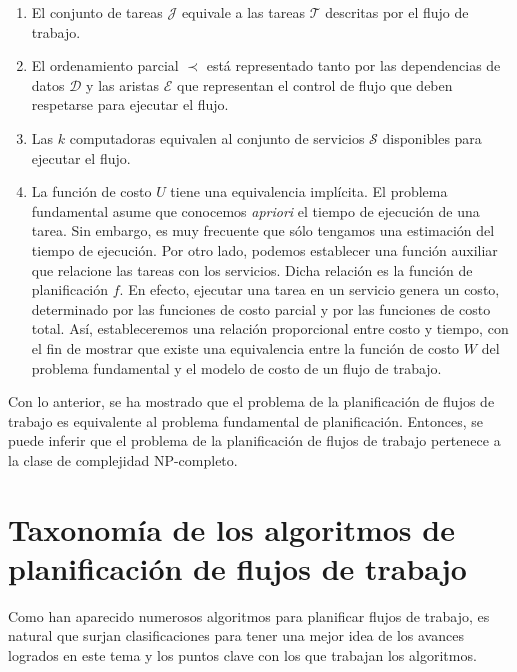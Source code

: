 \begin{enumerate}
\item El conjunto de tareas $\mathcal{J}$ equivale a las tareas $\mathcal{T}$ descritas por el flujo de trabajo.

\item El ordenamiento parcial $\prec$ está representado tanto por las dependencias de datos $\mathcal{D}$ y las aristas $\mathcal{E}$ que representan el control de flujo que deben respetarse para ejecutar el flujo.

\item Las $k$ computadoras equivalen al conjunto de servicios $\mathcal{S}$ disponibles para ejecutar el flujo.

\item La función de costo $U$ tiene una equivalencia implícita. El problema fundamental asume que conocemos \emph{apriori} el tiempo de ejecución de una tarea. Sin embargo, es muy frecuente que sólo tengamos una estimación del tiempo de ejecución. Por otro lado, podemos establecer una función auxiliar que relacione las tareas con los servicios. Dicha relación es la función de planificación $f$. En efecto, ejecutar una tarea en un servicio genera un costo, determinado por las funciones de costo parcial y por las funciones de costo total. Así, estableceremos una relación proporcional entre costo y tiempo, con el fin de mostrar que existe una equivalencia entre la función de costo $W$ del problema fundamental y el modelo de costo de un flujo de trabajo.
\end{enumerate}

Con lo anterior, se ha mostrado que el problema de la planificación de flujos de trabajo es equivalente al problema fundamental de planificación. Entonces, se puede inferir que el problema de la planificación de flujos de trabajo pertenece a la clase de complejidad NP-completo.



\section{Taxonomía de los algoritmos de planificación de flujos de trabajo}
\label{secc:taxonomy}

Como han aparecido numerosos algoritmos para planificar flujos de trabajo, es natural que surjan clasificaciones \cite{topcuoglu2002performance} \cite{yu2008workflow} para tener una mejor idea de los avances logrados en este tema y los puntos clave con los que trabajan los algoritmos.

